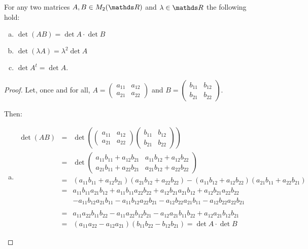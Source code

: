 \begin{lemma}
	For any two matrices $A,B\in M_2(\R)$ and $\lambda\in \R$ the following hold:
	\begin{enumerate}[a)]
		\item $\det(AB)=\det A\cdot\det B$
		\item $\det(\lambda A)=\lambda^2\det A$
		\item $\det A^t=\det A$.
	\end{enumerate}
\end{lemma}
\begin{proof}
	Let, once and for all, $A=\begin{pmatrix}
	a_{11}&a_{12}\\a_{21}&a_{22}
	\end{pmatrix}$ and $B=\begin{pmatrix}
	b_{11}&b_{12}\\b_{21}&b_{22}
	\end{pmatrix}$.
	
	Then:
	\begin{enumerate}[a)]
		\item		
		\[\begin{array}{rcl}
			\det(AB)&=&\det\left(\begin{pmatrix}
			a_{11}&a_{12}\\a_{21}&a_{22}
			\end{pmatrix}\begin{pmatrix}
			b_{11}&b_{12}\\b_{21}&b_{22}
			\end{pmatrix}\right)\\
			&=&\det\begin{pmatrix}
			a_{11}b_{11}+a_{12}b_{21} & a_{11}b_{12}+a_{12}b_{22}\\
			a_{21}b_{11}+a_{22}b_{21} & a_{21}b_{12}+a_{22}b_{22}
			\end{pmatrix}\\
			&=&(a_{11}b_{11}+a_{12}b_{21})(a_{21}b_{12}+a_{22}b_{22})-(a_{11}b_{12}+a_{12}b_{22})(a_{21}b_{11}+a_{22}b_{21})\\
			&=&a_{11}b_{11}a_{21}b_{12}+a_{11}b_{11}a_{22}b_{22}+a_{12}b_{21}a_{21}b_{12}+a_{12}b_{21}a_{22}b_{22}\\
			&&-a_{11}b_{12}a_{21}b_{11}-a_{11}b_{12}a_{22}b_{21}-a_{12}b_{22}a_{21}b_{11}-a_{12}b_{22}a_{22}b_{21}\\\\
			&=&a_{11}a_{22}b_{11}b_{22}-a_{11}a_{22}b_{12}b_{21}-a_{12}a_{21}b_{11}b_{22}+a_{12}a_{21}b_{12}b_{21}\\
			&=&(a_{11}a_{22}-a_{12}a_{21})(b_{11}b_{22}-b_{12}b_{21})=\det A\cdot\det B
		\end{array}\]
		

\end{enumerate}
\end{proof}
